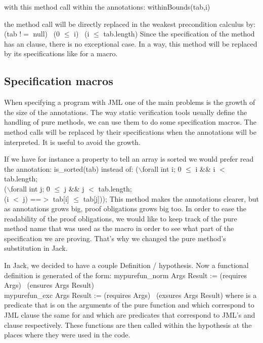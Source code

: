 with this method call within the annotations: 
\btab
withinBounds(tab,i)
\etab

the method call will be directly replaced in the weakest precondition calculus by:
\btab
(tab $!=$ null) \rarrow \ (0 $\le$ i) \conj \ (i $\le$ tab.length)
\etab
Since the specification
of the method has an  clause, there is no exceptional case.
In a way, this method will be replaced by its specifications like for a macro.



\subsection{Specification macros}


When specifying a program with JML one of the main problems is the 
growth of the size of the annotations. 
The way static verification tools usually define the handling 
of pure methods, we can use them to do some specification macros.
The method calls will be replaced by their specifications when the 
annotations will be interpreted. It is useful to avoid the growth.

If we have for instance a property to tell an array is sorted we would 
prefer read the annotation:
\btab
is\_sorted(tab)
\etab
instead of:
\btab
 ($\backslash$forall \=int i; 0 $\le$ i \&\& i $<$ tab.length;\+\\ 
 ($\backslash$forall int j; \=0 $\le$ j \&\& j $<$ tab.length; \+\\(i $<$ j) ==$>$ tab[i] $\le$ tab[j]));
\etab
This method makes the annotations clearer, but as annotations 
grows big, proof obligations grows big too. In order to ease the readability 
of the proof obligations, we would like to keep track of the pure method name
that was used as the macro in order to see what part of the specification we 
are proving. That's why we changed the pure method's substitution in Jack.

In Jack, we decided to have a couple Definition / hypothesis.
Now a functional definition is generated of the form:
\btab
mypurefun\_norm  Args Result := (requires Args) \rarrow \ (ensures Args Result)\\
mypurefun\_exc  Args Result := (requires Args) \rarrow \ (exsures Args Result)
\etab
where  is a predicate that is on the arguments of the pure function and 
which correspond to JML  clause the same for  and  
which are predicates that correspond to JML's  and  clause respectively.
These functions are then called within the hypothesis at the places where they were used in the code. 

